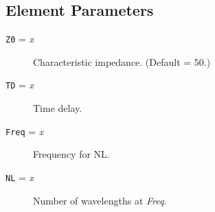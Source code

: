 \subsection{Element Parameters}

\begin{description}

\item[{\tt Z0} = {\it x}] Characteristic impedance.  (Default = 50.)

\item[{\tt TD} = {\it x}] Time delay.

\item[{\tt Freq} = {\it x}] Frequency for NL.

\item[{\tt NL} = {\it x}] Number of wavelengths at {\it Freq}.

\end{description}
